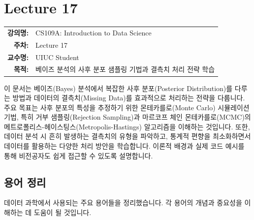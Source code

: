 \documentclass[11pt,a4paper]{book}
\makeatletter
\providecommand{\newsection}{\section}
\theoremstyle{definition}
\newcommand{\metainfo}[4]{
\begin{tcolorbox}[
    colback=lightpurple,
    colframe=darkpurple,
    boxrule=1pt,
    arc=2mm,
    left=10pt,
    right=10pt,
    top=8pt,
    bottom=8pt
]
\begin{tabular}{@{}rl@{}}
\textbf{강의명:} & #1 \\[0.3em]
\textbf{주차:} & #2 \\[0.3em]
\textbf{교수명:} & #3 \\[0.3em]
\textbf{목적:} & \begin{minipage}[t]{0.75\textwidth}#4\end{minipage}
\end{tabular}
\end{tcolorbox}
}
\makeatother
\begin{document}
\chapter{Lecture 17}
\label{ch:lecture17}

\metainfo{CS109A: Introduction to Data Science}{Lecture 17}{UIUC Student}{베이즈 분석의 사후 분포 샘플링 기법과 결측치 처리 전략 학습}


\begin{overviewbox}
이 문서는 베이즈(Bayes) 분석에서 복잡한 사후 분포(Posterior Distribution)를 다루는 방법과 데이터의 결측치(Missing Data)를 효과적으로 처리하는 전략을 다룹니다.
주요 목표는 사후 분포의 특성을 추정하기 위한 몬테카를로(Monte Carlo) 시뮬레이션 기법, 특히 거부 샘플링(Rejection Sampling)과 마르코프 체인 몬테카를로(MCMC)의 메트로폴리스-헤이스팅스(Metropolis-Hastings) 알고리즘을 이해하는 것입니다.
또한, 데이터 분석 시 흔히 발생하는 결측치의 유형을 파악하고, 통계적 편향을 최소화하면서 데이터를 활용하는 다양한 처리 방안을 학습합니다.
이론적 배경과 실제 코드 예시를 통해 비전공자도 쉽게 접근할 수 있도록 설명합니다.
\end{overviewbox}

\newsection{용어 정리}
데이터 과학에서 사용되는 주요 용어들을 정리했습니다. 각 용어의 개념과 중요성을 이해하는 데 도움이 될 것입니다.
\end{document}
